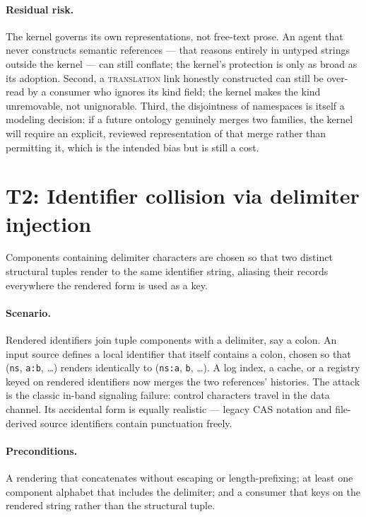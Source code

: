\paragraph{Residual risk.} The kernel governs its own representations, not free-text prose. An agent that never constructs semantic references --- that reasons entirely in untyped strings outside the kernel --- can still conflate; the kernel's protection is only as broad as its adoption. Second, a \textsc{translation} link honestly constructed can still be over-read by a consumer who ignores its kind field; the kernel makes the kind unremovable, not unignorable. Third, the disjointness of namespaces is itself a modeling decision: if a future ontology genuinely merges two families, the kernel will require an explicit, reviewed representation of that merge rather than permitting it, which is the intended bias but is still a cost.

\section{T2: Identifier collision via delimiter injection}\label{threat:t2}

\begin{threat}\label{threat:thr:collision}
Components containing delimiter characters are chosen so that two distinct structural tuples render to the same identifier string, aliasing their records everywhere the rendered form is used as a key.
\end{threat}

\paragraph{Scenario.} Rendered identifiers join tuple components with a delimiter, say a colon. An input source defines a local identifier that itself contains a colon, chosen so that (\texttt{ns}, \texttt{a:b}, \ldots) renders identically to (\texttt{ns:a}, \texttt{b}, \ldots). A log index, a cache, or a registry keyed on rendered identifiers now merges the two references' histories. The attack is the classic in-band signaling failure: control characters travel in the data channel. Its accidental form is equally realistic --- legacy CAS notation and file-derived source identifiers contain punctuation freely.

\paragraph{Preconditions.} A rendering that concatenates without escaping or length-prefixing; at least one component alphabet that includes the delimiter; and a consumer that keys on the rendered string rather than the structural tuple.

